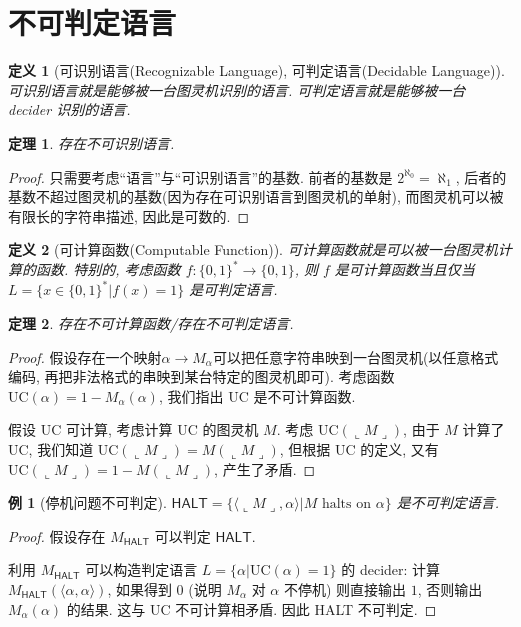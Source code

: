 \documentclass[8pt]{article}
\theoremstyle{compact}
\newtheorem{theorem}{定理}
\newtheorem{definition}{定义}
\newtheorem{example}{例}
\def\rep#1{\llcorner{#1}\lrcorner}
\begin{document}
\section{不可判定语言}
\begin{definition}[可识别语言(Recognizable Language), 可判定语言(Decidable Language)]
	可识别语言就是能够被一台图灵机识别的语言. 可判定语言就是能够被一台 decider 识别的语言.
\end{definition}
\begin{theorem}
	存在不可识别语言.
\end{theorem}
\begin{proof}
	只需要考虑“语言”与“可识别语言”的基数. 前者的基数是 $2^{\aleph_0} = \aleph_1$, 后者的基数不超过图灵机的基数(因为存在可识别语言到图灵机的单射), 而图灵机可以被有限长的字符串描述, 因此是可数的.
\end{proof}
\begin{definition}[可计算函数(Computable Function)]
	可计算函数就是可以被一台图灵机计算的函数. 特别的, 考虑函数 $f: \{0, 1\}^* \to \{0, 1\}$, 则 $f$ 是可计算函数当且仅当 $L = \{x \in \{0, 1\}^*| f(x) = 1\}$ 是可判定语言.
\end{definition}
\begin{theorem}
	存在不可计算函数/存在不可判定语言.
\end{theorem}
\begin{proof}
	假设存在一个映射$\alpha \to M_{\alpha}$可以把任意字符串映到一台图灵机(以任意格式编码, 再把非法格式的串映到某台特定的图灵机即可). 考虑函数 $\text{UC}(\alpha) = 1 - M_{\alpha}(\alpha)$, 我们指出 $\text{UC}$ 是不可计算函数.

	假设 $\text{UC}$ 可计算, 考虑计算 $\text{UC}$ 的图灵机 $M$. 考虑 $\text{UC}(\rep{M})$, 由于 $M$ 计算了 $\text{UC}$, 我们知道 $\text{UC}(\rep{M}) = M(\rep M)$, 但根据 $\text{UC}$ 的定义, 又有 $\text{UC}(\rep M) = 1 - M(\rep M)$, 产生了矛盾.
\end{proof}
\begin{example}[停机问题不可判定]
	$\textsf{HALT} = \{\langle \rep M, \alpha \rangle | M \text{ halts on } \alpha\}$ 是不可判定语言.
\end{example}
\begin{proof}
	假设存在 $M_{\textsf{HALT}}$ 可以判定 $\textsf{HALT}$.
	
	利用 $M_{\textsf{HALT}}$ 可以构造判定语言 $L = \{\alpha | \text{UC}(\alpha) = 1\}$ 的 decider: 计算 $M_{\textsf{HALT}}(\langle \alpha, \alpha \rangle)$, 如果得到 $0$ (说明 $M_{\alpha}$ 对 $\alpha$ 不停机) 则直接输出 $1$, 否则输出$M_{\alpha}(\alpha)$ 的结果. 这与 $\text{UC}$ 不可计算相矛盾. 因此 \textsf{HALT} 不可判定.
\end{proof}
\end{document}
